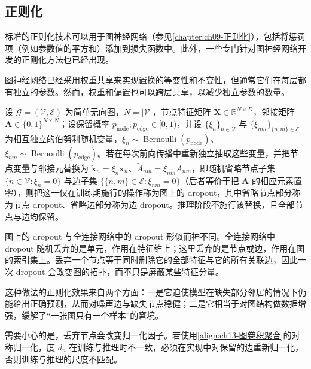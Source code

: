 \documentclass[../../main.tex]{subfiles}
\begin{document}
\subsection{正则化}\label{subsection:ch13-正则化}

标准的正则化技术可以用于图神经网络（参见\cref{chapter:ch09-正则化}），包括将惩罚项（例如参数值的平方和）添加到损失函数中。此外，一些专门针对图神经网络开发的正则化方法也已经出现。

图神经网络已经采用权重共享来实现置换的等变性和不变性，但通常它们在每层都有独立的参数。然而，权重和偏置也可以跨层共享，以减少独立参数的数量。

\begin{definition}\label{definition:ch13-图dropout}
设 $\mathcal{G}=(\mathcal{V},\mathcal{E})$ 为简单无向图，$N=|\mathcal{V}|$，节点特征矩阵 $\bm{X}\in\mathbb{R}^{N\times D}$，邻接矩阵 $\bm{A}\in\{0,1\}^{N\times N}$；设保留概率 $p_{\mathrm{node}},p_{\mathrm{edge}}\in[0,1)$，并设 $\{\xi_n\}_{n\in\mathcal{V}}$ 与 $\{\xi_{nm}\}_{\{n,m\}\in\mathcal{E}}$ 为相互独立的伯努利随机变量，$\xi_n\sim\operatorname{Bernoulli}(p_{\mathrm{node}})$、$\xi_{nm}\sim\operatorname{Bernoulli}(p_{\mathrm{edge}})$。若在每次前向传播中重新独立抽取这些变量，并把节点变量与邻接元替换为 $\widetilde{\bm{x}}_n=\xi_n\bm{x}_n$、$\widetilde{A}_{nm}=\xi_{nm}A_{nm}$，即随机省略节点子集 $\{n\in\mathcal{V}:\xi_n=0\}$ 与边子集 $\{\{n,m\}\in\mathcal{E}:\xi_{nm}=0\}$（后者等价于把 $\bm{A}$ 的相应元素置零），则把这一仅在训练期施行的操作称为图上的 dropout，其中省略节点部分称为节点 dropout、省略边部分称为边 dropout。推理阶段不施行该替换，且全部节点与边均保留。
\end{definition}

\begin{remark}
图上的 dropout 与全连接网络中的 dropout 形似而神不同。全连接网络中 dropout 随机丢弃的是单元，作用在特征维上；这里丢弃的是节点或边，作用在图的索引集上。丢弃一个节点等于同时删除它的全部特征与它的所有关联边，因此一次 dropout 会改变图的拓扑，而不只是屏蔽某些特征分量。\par
这种做法的正则化效果来自两个方面：一是它迫使模型在缺失部分邻居的情况下仍能给出正确预测，从而对噪声边与缺失节点稳健；二是它相当于对图结构做数据增强，缓解了“一张图只有一个样本”的窘境。\par
需要小心的是，丢弃节点会改变归一化因子。若使用\eqref{align:ch13-图卷积聚合}的对称归一化，度 $d_n$ 在训练与推理时不一致，必须在实现中对保留的边重新归一化，否则训练与推理的尺度不匹配。
\end{remark}
\end{document}
